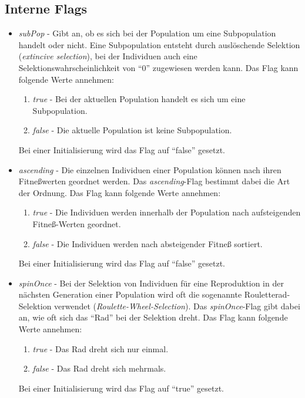 \documentclass{report}
\begin{document}
\subsection{Interne Flags}
\begin{itemize}

\item {\em subPop} -
Gibt an, ob es sich bei der Population um eine 
Subpopulation handelt oder nicht. Eine Subpopulation entsteht durch 
ausl\"oschende Selektion ({\em extincive selection}), bei der Individuen 
auch eine Selektionswahrscheinlichkeit von ``0'' zugewiesen werden kann. 
Das Flag kann folgende Werte annehmen:
\begin{enumerate}
\item {\em true} - Bei der aktuellen Population handelt es sich um
 eine Subpopulation.
\item {\em false} - Die aktuelle Population ist keine Subpopulation.
\end{enumerate}
Bei einer Initialisierung wird das Flag auf ``false'' gesetzt.

\newpage
\item {\em ascending} -
Die einzelnen Individuen einer Population k\"onnen nach ihren 
Fitne{\ss}werten geordnet werden. Das {\em ascending}-Flag bestimmt dabei die Art 
der Ordnung. 
Das Flag kann folgende Werte annehmen:
\begin{enumerate}
\item {\em true} - Die Individuen werden innerhalb der Population nach 
aufsteigenden Fitne{\ss}-Werten geordnet.
\item {\em false} - Die Individuen werden nach absteigender Fitne{\ss} 
 sortiert.
\end{enumerate}
Bei einer Initialisierung wird das Flag auf ``false'' gesetzt.

\item {\em spinOnce} -
Bei der Selektion von Individuen f\"ur eine
Reproduktion in der n\"achsten Generation einer Population wird oft die
sogenannte Rouletterad-Selektion verwendet ({\em Roulette-Wheel-Selection}).
Das {\em spinOnce}-Flag gibt dabei an, wie oft sich das
``Rad'' bei der Selektion dreht. Das Flag kann folgende Werte annehmen:
\begin{enumerate}
\item {\em true} - Das Rad dreht sich nur einmal.
\item {\em false} - Das Rad dreht sich mehrmals.
\end{enumerate}
Bei einer Initialisierung wird das Flag auf ``true'' gesetzt.

\end{itemize}
\newpage
\end{document}
